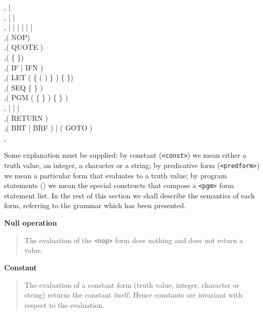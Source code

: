 \begin{bnf}
	           \sep {} |  \\
		   \sep {} |  |  \\
	  \sep {} |  |  |  |  |
							 |  \\
				   \sep ( NOP) \\
			   \sep ( QUOTE ) \\
			   \sep ( \{  \})\\
				   \sep ( IF | IFN   ) \\
				   \sep ( LET ( \{ (   ) \} ) \{  \})
							\\ 
				   \sep ( SEQ \{  \} )\\
				   \sep ( PGM ( \{  \} ) \{  \} )\\
			   \sep {} |  |  | \\
				   \sep ( RETURN  ) \\
			   \sep ( BRT | BRF   ) | ( GOTO
							 )\\
			   \sep {}
\end{bnf}
%
Some explanation must be supplied: by constant ({\tt <const>}) we mean either
a truth value, an integer, a character or a string; by predicative form
({\tt <predform>}) we mean a particular form that evaluates to a truth value;
by program statements ({\tt <pgm-stm>}) we mean the special constructs that
compose a {\tt <pgm>} form statement list.
In the rest of this section we shall describe the semantics of each form,
referring to the grammar which has been presented.

\bigskip

{\bf Null operation}
\begin{quote}
	The evaluation of the {\tt <nop>} form does nothing and does not return a
	value.
\end{quote}

{\bf Constant}
\begin{quote}
	The evaluation of a constant form (truth value, integer, character or
	string) returns the constant itself. Hence {\HG} constants are invariant
	with respect to the evaluation.
\end{quote}

